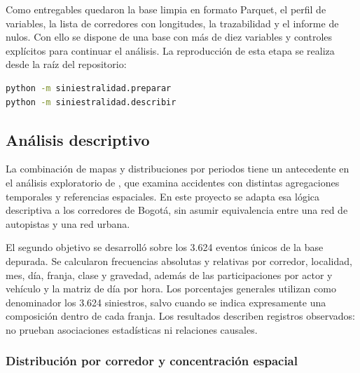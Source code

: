\documentclass[12pt,letterpaper]{article}
\begin{document}
Como entregables quedaron la base limpia en formato Parquet, el perfil
de variables, la lista de corredores con longitudes, la trazabilidad y
el informe de nulos. Con ello se dispone de una base con más de diez
variables y controles explícitos para continuar el análisis. La
reproducción de esta etapa se realiza desde la raíz del repositorio:

\begin{lstlisting}[language=bash]
python -m siniestralidad.preparar
python -m siniestralidad.describir
\end{lstlisting}

\hypertarget{analisis-descriptivo-oe2}{%
\subsection{Análisis descriptivo}\label{analisis-descriptivo-oe2}}

La combinación de mapas y distribuciones por periodos tiene un antecedente
en el análisis exploratorio de \citet{zhang2023}, que examina accidentes
con distintas agregaciones temporales y referencias espaciales. En este
proyecto se adapta esa lógica descriptiva a los corredores de Bogotá,
sin asumir equivalencia entre una red de autopistas y una red urbana.

El segundo objetivo se desarrolló sobre los 3.624 eventos únicos de la
base depurada. Se calcularon frecuencias absolutas y relativas por
corredor, localidad, mes, día, franja, clase y gravedad, además de las
participaciones por actor y vehículo y la matriz de día por hora. Los
porcentajes generales utilizan como denominador los 3.624 siniestros,
salvo cuando se indica expresamente una composición dentro de cada
franja. Los resultados describen registros observados: no prueban
asociaciones estadísticas ni relaciones causales.

\subsubsection{Distribución por corredor y concentración espacial}
\end{document}
